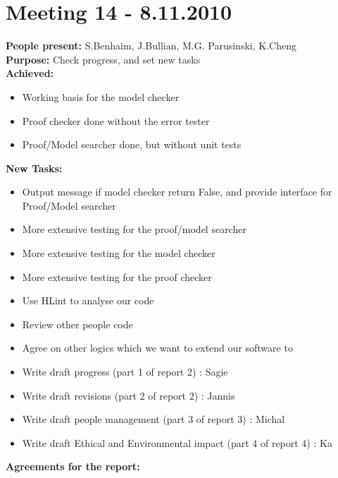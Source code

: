 \documentclass[12pt,a4paper]{article}
\begin{document}
\section*{Meeting 14 - 8.11.2010}

\textbf{People present:} S.Benhaim, J.Bullian, M.G. Parusinski, K.Cheng \\
\textbf{Purpose:} Check progress, and set new tasks \\
\textbf{Achieved:}
\begin{itemize}
\item Working basis for the model checker
\item Proof checker done without the error tester
\item Proof/Model searcher done, but without unit tests
\end{itemize}
\textbf{New Tasks:}
\begin{itemize}
\item Output message if model checker return False, and provide interface for Proof/Model searcher
\item More extensive testing for the proof/model searcher
\item More extensive testing for the model checker
\item More extensive testing for the proof checker
\item Use HLint to analyse our code
\item Review other people code
\item Agree on other logics which we want to extend our software to
\item Write draft progress (part 1 of report 2) : Sagie
\item Write draft revisions (part 2 of report 2) : Jannis
\item Write draft people management (part 3 of report 3) : Michal
\item Write draft Ethical and Environmental impact (part 4 of report 4) : Ka
\end{itemize}
\textbf{Agreements for the report:}
\end{document}
